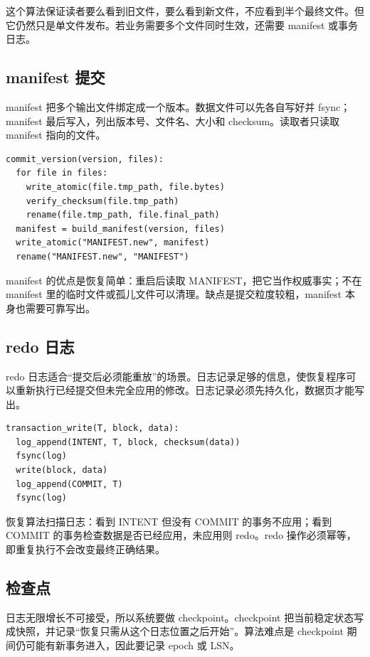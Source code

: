 这个算法保证读者要么看到旧文件，要么看到新文件，不应看到半个最终文件。但它仍然只是单文件发布。若业务需要多个文件同时生效，还需要 manifest 或事务日志。

\subsection{manifest 提交}

manifest 把多个输出文件绑定成一个版本。数据文件可以先各自写好并 fsync；manifest 最后写入，列出版本号、文件名、大小和 checksum。读取者只读取 manifest 指向的文件。

\begin{lstlisting}
commit_version(version, files):
  for file in files:
    write_atomic(file.tmp_path, file.bytes)
    verify_checksum(file.tmp_path)
    rename(file.tmp_path, file.final_path)
  manifest = build_manifest(version, files)
  write_atomic("MANIFEST.new", manifest)
  rename("MANIFEST.new", "MANIFEST")
\end{lstlisting}

manifest 的优点是恢复简单：重启后读取 MANIFEST，把它当作权威事实；不在 manifest 里的临时文件或孤儿文件可以清理。缺点是提交粒度较粗，manifest 本身也需要可靠写出。

\subsection{redo 日志}

redo 日志适合“提交后必须能重放”的场景。日志记录足够的信息，使恢复程序可以重新执行已经提交但未完全应用的修改。日志记录必须先持久化，数据页才能写出。

\begin{lstlisting}
transaction_write(T, block, data):
  log_append(INTENT, T, block, checksum(data))
  fsync(log)
  write(block, data)
  log_append(COMMIT, T)
  fsync(log)
\end{lstlisting}

恢复算法扫描日志：看到 INTENT 但没有 COMMIT 的事务不应用；看到 COMMIT 的事务检查数据是否已经应用，未应用则 redo。redo 操作必须幂等，即重复执行不会改变最终正确结果。

\subsection{检查点}

日志无限增长不可接受，所以系统要做 checkpoint。checkpoint 把当前稳定状态写成快照，并记录“恢复只需从这个日志位置之后开始”。算法难点是 checkpoint 期间仍可能有新事务进入，因此要记录 epoch 或 LSN。

